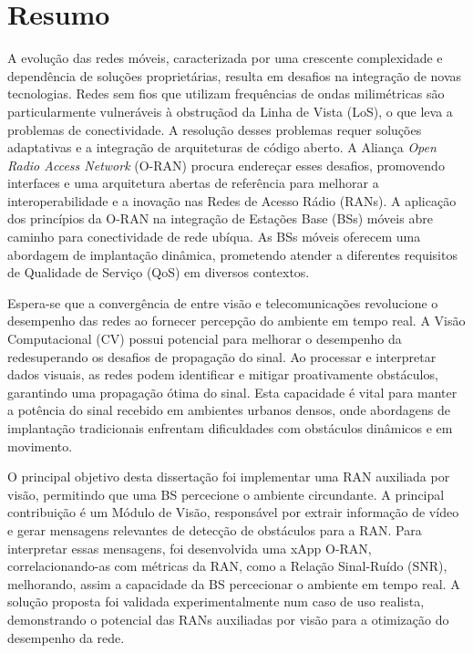 \chapter*{Resumo}
A evolução das redes móveis, caracterizada por uma crescente complexidade e dependência de soluções proprietárias, resulta em desafios na integração de novas tecnologias.
Redes sem fios que utilizam frequências de ondas milimétricas são particularmente vulneráveis à obstruçãod da Linha de Vista (LoS), o que leva a problemas de conectividade.
A resolução desses problemas requer soluções adaptativas e a integração de arquiteturas de código aberto.
A Aliança \textit{Open Radio Access Network} (O-RAN) procura endereçar esses desafios, promovendo interfaces e uma arquitetura abertas de referência para melhorar a interoperabilidade e a inovação nas Redes de Acesso Rádio (RANs).
A aplicação dos princípios da O-RAN na integração de Estações Base  (BSs) móveis abre caminho para conectividade de rede ubíqua.
As BSs móveis oferecem uma abordagem de implantação dinâmica, prometendo atender a diferentes requisitos de Qualidade de Serviço (QoS) em diversos contextos.

Espera-se que a convergência de entre visão e telecomunicações revolucione o desempenho das redes ao fornecer percepção do ambiente em tempo real.
A Visão Computacional (CV) possui potencial para melhorar o desempenho da redesuperando os desafios de propagação do sinal.
Ao processar e interpretar dados visuais, as redes podem identificar e mitigar proativamente obstáculos, garantindo uma propagação ótima do sinal.
Esta capacidade é vital para manter a potência do sinal recebido em ambientes urbanos densos, onde abordagens de implantação tradicionais enfrentam dificuldades com obstáculos dinâmicos e em movimento.

O principal objetivo desta dissertação foi implementar uma RAN auxiliada por visão, permitindo que uma BS percecione o ambiente circundante.
A principal contribuição é um Módulo de Visão, responsável por extrair informação de vídeo e gerar mensagens relevantes de detecção de obstáculos para a RAN\@.
Para interpretar essas mensagens, foi desenvolvida uma xApp O-RAN, correlacionando-as com métricas da RAN, como a Relação Sinal-Ruído (SNR), melhorando, assim a capacidade da BS percecionar o ambiente em tempo real.
A solução proposta foi validada experimentalmente num caso de uso realista, demonstrando o potencial das RANs auxiliadas por visão para a otimização do desempenho da rede.